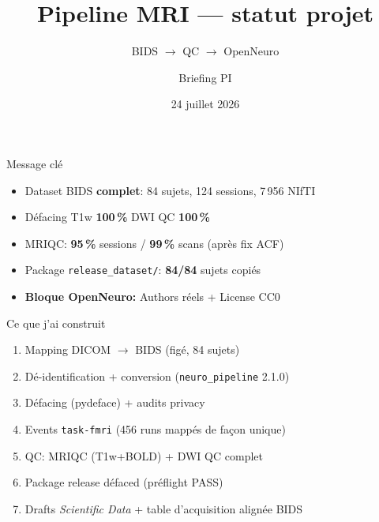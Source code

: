 \documentclass[aspectratio=169,11pt]{beamer}
\title{Pipeline MRI --- statut projet}
\subtitle{BIDS $\rightarrow$ QC $\rightarrow$ OpenNeuro}
\author{Briefing PI}
\date{24 juillet 2026}
\begin{document}
\begin{frame}{Message clé}
\begin{itemize}
  \item Dataset BIDS \textbf{complet}: 84 sujets, 124 sessions, 7\,956 NIfTI
  \item Défacing T1w \textbf{100\,\%} \quad DWI QC \textbf{100\,\%}
  \item MRIQC: \textbf{95\,\%} sessions / \textbf{99\,\%} scans (après fix ACF)
  \item Package \texttt{release\_dataset/}: \textbf{84/84} sujets copiés
  \item \textcolor{fail}{\textbf{Bloque OpenNeuro:}} Authors réels + License CC0
\end{itemize}
\vspace{4mm}
\begin{center}
\end{center}
\end{frame}

\begin{frame}{Ce que j'ai construit}
\begin{enumerate}
  \item Mapping DICOM $\rightarrow$ BIDS (figé, 84 sujets)
  \item Dé-identification + conversion (\texttt{neuro\_pipeline} 2.1.0)
  \item Défacing (pydeface) + audits privacy
  \item Events \texttt{task-fmri} (456 runs mappés de façon unique)
  \item QC: MRIQC (T1w+BOLD) + DWI QC complet
  \item Package release défaced (préflight PASS)
  \item Drafts \textit{Scientific Data} + table d'acquisition alignée BIDS
\end{enumerate}
\end{frame}
\end{document}
